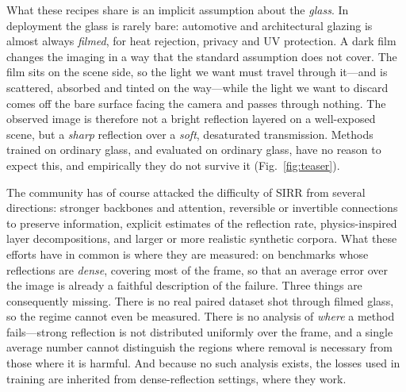 What these recipes share is an implicit assumption about the \emph{glass}. In deployment the glass
is rarely bare: automotive and architectural glazing is almost always \emph{filmed}, for heat
rejection, privacy and UV protection. A dark film changes the imaging in a way that the standard
assumption does not cover. The film sits on the scene side, so the light we want must travel through
it---and is scattered, absorbed and tinted on the way---while the light we want to discard comes off
the bare surface facing the camera and passes through nothing. The observed image is therefore not a
bright reflection layered on a well-exposed scene, but a \emph{sharp} reflection over a \emph{soft},
desaturated transmission. Methods trained on ordinary glass, and evaluated on ordinary glass, have no
reason to expect this, and empirically they do not survive it (Fig.~\ref{fig:teaser}).

The community has of course attacked the difficulty of SIRR from several directions: stronger
backbones and attention, reversible or invertible connections to preserve information, explicit
estimates of the reflection rate, physics-inspired layer decompositions, and larger or more realistic
synthetic corpora. What these efforts have in common is where they are measured: on benchmarks whose
reflections are \emph{dense}, covering most of the frame, so that an average error over the image is
already a faithful description of the failure. Three things are consequently missing. There is no
real paired dataset shot through filmed glass, so the regime cannot even be measured. There is no
analysis of \emph{where} a method fails---strong reflection is not distributed uniformly over the
frame, and a single average number cannot distinguish the regions where removal is necessary from
those where it is harmful. And because no such analysis exists, the losses used in training are
inherited from dense-reflection settings, where they work.

